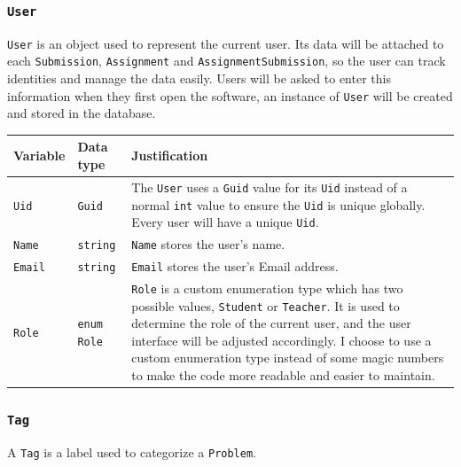 \documentclass[a4paper]{report}
\begin{document}
\subsubsection{\texttt{User}}

\texttt{User} is an object used to represent the current user. Its data will be attached to each \texttt{Submission}, \texttt{Assignment} and \texttt{AssignmentSubmission}, so the user can track identities and manage the data easily. Users will be asked to enter this information when they first open the software, an instance of \texttt{User} will be created and stored in the database.

\begin{tabulary}{\textwidth}{|l|l|L|}
    \hline
    Variable & Data type & Justification \\
    \hline
    \texttt{Uid} & \texttt{Guid} & The \texttt{User} uses a \texttt{Guid} value for its \texttt{Uid} instead of a normal \texttt{int} value to ensure the \texttt{Uid} is unique globally. Every user will have a unique \texttt{Uid}. \\
    \hline
    \texttt{Name} & \texttt{string} & \texttt{Name} stores the user's name. \\
    \hline
    \texttt{Email} & \texttt{string} & \texttt{Email} stores the user's Email address. \\
    \hline
    \texttt{Role} & \texttt{enum Role} & \texttt{Role} is a custom enumeration type which has two possible values, \texttt{Student} or \texttt{Teacher}. It is used to determine the role of the current user, and the user interface will be adjusted accordingly. I choose to use a custom enumeration type instead of some magic numbers to make the code more readable and easier to maintain. \\
    \hline
\end{tabulary}

\subsubsection{\texttt{Tag}}

A \texttt{Tag} is a label used to categorize a \texttt{Problem}.
\end{document}
